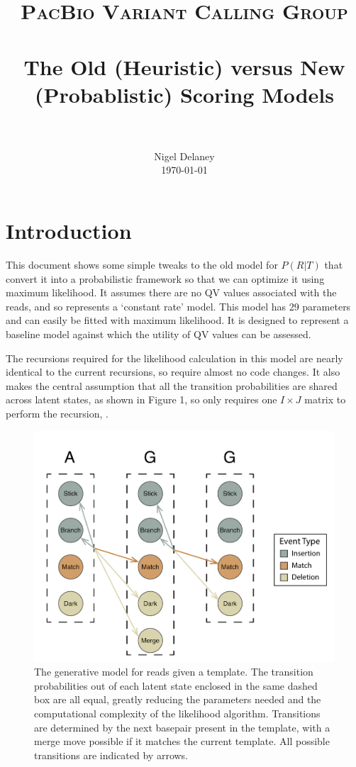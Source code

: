 \documentclass[paper=a4, fontsize=11pt]{scrartcl}
\title{
		\usefont{OT1}{bch}{b}{n}
		\normalfont \normalsize \textsc{PacBio Variant Calling Group} \\ [25pt]
		\horrule{0.5pt} \\[0.4cm]
		\huge The Old (Heuristic) versus New (Probablistic) Scoring Models\\
		\horrule{2pt} \\[0.5cm]
}
\author{
		\normalfont 								\normalsize
        Nigel Delaney\\[-3pt]		\normalsize
        \today
}
\date{}
\numberwithin{equation}{section}		%
\numberwithin{figure}{section}			%
\numberwithin{table}{section}				%
\begin{document}
\maketitle

\section{Introduction}

This document shows some simple tweaks to the old model for $P(R|T)$ that convert it into a probabilistic framework so that we can optimize it using maximum likelihood.  It assumes there are no QV values associated with the reads, and so represents a `constant rate' model.   This model has 29 parameters and can easily be fitted with maximum likelihood.  It is designed to represent a baseline model against which the utility of QV values can be assessed.  

The recursions required for the likelihood calculation in this model are nearly identical to the current recursions, so require almost no code changes.  It also makes the central assumption that all the transition probabilities are shared across latent states, as shown in Figure 1, so only requires one $I \times J$ matrix to perform the recursion, .


\begin{figure}[H] %
	\includegraphics{CCSScoring}
		\caption{The generative model for reads given a template.  The transition probabilities out of each latent state enclosed in the same dashed box are all equal, greatly reducing the parameters needed and the computational complexity of the likelihood algorithm.  Transitions are determined by the next basepair present in the template, with a merge move possible if it matches the current template.  All possible transitions are indicated by arrows.}
\end{figure}
\end{document}
